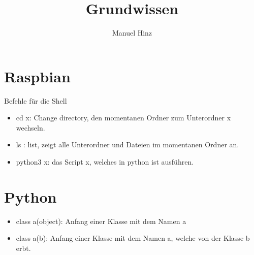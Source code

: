 \documentclass{article}
\author{Manuel Hinz}
\title{Grundwissen}
\begin{document}
\maketitle

\section{Raspbian}

Befehle f\"{u}r die Shell

\begin{itemize}

\item cd x: Change directory, den momentanen Ordner zum Unterordner x wechseln.

\item ls : list, zeigt alle Unterordner und Dateien im momentanen Ordner an.  

\item python3 x: das Script x, welches in python ist ausf\"{u}hren. 

\end{itemize}

\section{Python}

\begin{itemize}

\item class a(object): Anfang einer Klasse mit dem Namen a

\item class a(b): Anfang einer Klasse  mit dem Namen a, welche von der Klasse b erbt. 

\end{itemize}
\end{document}
